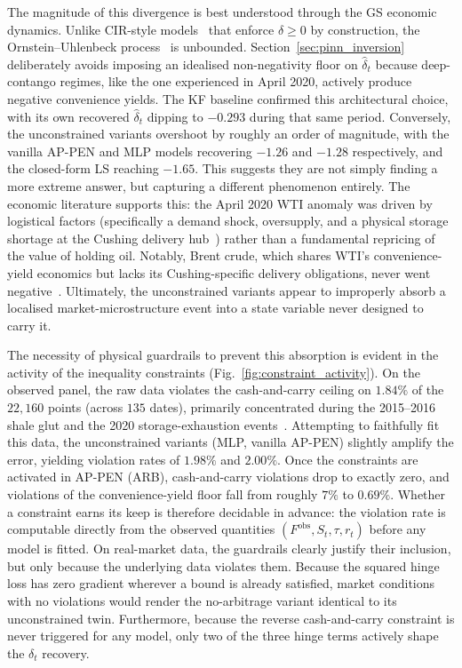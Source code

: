 \documentclass[sigconf, authorversion=true, nonacm=true]{acmart}
\begin{document}
The magnitude of this divergence is best understood through the GS economic dynamics. Unlike CIR-style models~\cite{Liu2009No-ArbitrageStructures} that enforce $\delta \ge 0$ by construction, the Ornstein--Uhlenbeck process~\cite{uhlenbeck1930theory} is unbounded. Section~\ref{sec:pinn_inversion} deliberately avoids imposing an idealised non-negativity floor on $\hat{\delta}_t$ because deep-contango regimes, like the one experienced in April 2020, actively produce negative convenience yields. The KF baseline confirmed this architectural choice, with its own recovered $\hat{\delta}_t$ dipping to $-0.293$ during that same period. Conversely, the unconstrained variants overshoot by roughly an order of magnitude, with the vanilla AP-PEN and MLP models recovering $-1.26$ and $-1.28$ respectively, and the closed-form LS reaching $-1.65$. This suggests they are not simply finding a more extreme answer, but capturing a different phenomenon entirely. The economic literature supports this: the April 2020 WTI anomaly was driven by logistical factors (specifically a demand shock, oversupply, and a physical storage shortage at the Cushing delivery hub~\cite{Burns2022Arbitrage}) rather than a fundamental repricing of the value of holding oil. Notably, Brent crude, which shares WTI's convenience-yield economics but lacks its Cushing-specific delivery obligations, never went negative~\cite{FernandezPerez2022Negative}. Ultimately, the unconstrained variants appear to improperly absorb a localised market-microstructure event into a state variable never designed to carry it.

The necessity of physical guardrails to prevent this absorption is evident in the activity of the inequality constraints (Fig.~\ref{fig:constraint_activity}). On the observed panel, the raw data violates the cash-and-carry ceiling on $1.84\%$ of the $22{,}160$ points (across $135$ dates), primarily concentrated during the 2015--2016 shale glut and the 2020 storage-exhaustion events~\cite{fattouh2016oilfall, gilje2024benchmarks}. Attempting to faithfully fit this data, the unconstrained variants (MLP, vanilla AP-PEN) slightly amplify the error, yielding violation rates of $1.98\%$ and $2.00\%$. Once the constraints are activated in AP-PEN (ARB), cash-and-carry violations drop to exactly zero, and violations of the convenience-yield floor fall from roughly $7\%$ to $0.69\%$. Whether a constraint earns its keep is therefore decidable in advance: the violation rate is computable directly from the observed quantities $(F^{\mathrm{obs}}, S_t, \tau, r_t)$ before any model is fitted. On real-market data, the guardrails clearly justify their inclusion, but only because the underlying data violates them. Because the squared hinge loss has zero gradient wherever a bound is already satisfied, market conditions with no violations would render the no-arbitrage variant identical to its unconstrained twin. Furthermore, because the reverse cash-and-carry constraint is never triggered for any model, only two of the three hinge terms actively shape the $\delta_t$ recovery.
\end{document}
